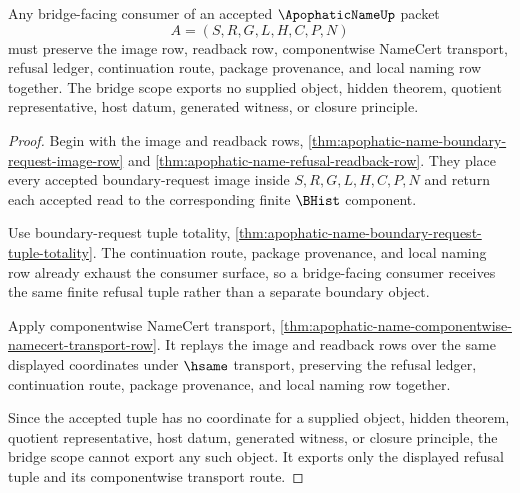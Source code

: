 \begin{theorem}
\label{thm:apophatic-name-refusal-tuple-bridge-scope}
Any bridge-facing consumer of an accepted $\ApophaticNameUp$ packet
$$
A=(S,R,G,L,H,C,P,N)
$$
must preserve the image row, readback row, componentwise NameCert transport, refusal ledger, continuation route, package provenance, and local naming row together. The bridge scope exports no supplied object, hidden theorem, quotient representative, host datum, generated witness, or closure principle.
\end{theorem}
\begin{proof}
Begin with the image and readback rows, \autoref{thm:apophatic-name-boundary-request-image-row} and \autoref{thm:apophatic-name-refusal-readback-row}. They place every accepted boundary-request image inside $S,R,G,L,H,C,P,N$ and return each accepted read to the corresponding finite $\BHist$ component.

Use boundary-request tuple totality, \autoref{thm:apophatic-name-boundary-request-tuple-totality}. The continuation route, package provenance, and local naming row already exhaust the consumer surface, so a bridge-facing consumer receives the same finite refusal tuple rather than a separate boundary object.

Apply componentwise NameCert transport, \autoref{thm:apophatic-name-componentwise-namecert-transport-row}. It replays the image and readback rows over the same displayed coordinates under $\hsame$ transport, preserving the refusal ledger, continuation route, package provenance, and local naming row together.

Since the accepted tuple has no coordinate for a supplied object, hidden theorem, quotient representative, host datum, generated witness, or closure principle, the bridge scope cannot export any such object. It exports only the displayed refusal tuple and its componentwise transport route.
\end{proof}

